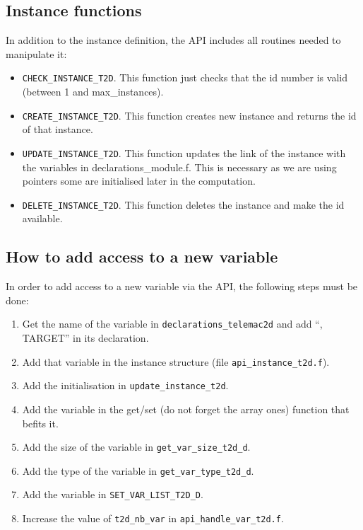 \subsection{Instance functions}

In addition to the instance definition, the API includes all routines needed to
manipulate it:

\begin{itemize}
\item \verb!CHECK_INSTANCE_T2D!. This function just checks that the id number
  is valid (between 1 and max\_instances).
\item \verb!CREATE_INSTANCE_T2D!. This function creates new instance and
  returns the id of that instance.
\item \verb!UPDATE_INSTANCE_T2D!. This function updates the link of the
  instance with the variables in declarations\_module.f. This is necessary as
  we are using pointers some are initialised later in the computation.
\item \verb!DELETE_INSTANCE_T2D!. This function deletes the instance and make
  the id available.
\end{itemize}
%
\subsection{How to add access to a new variable}
\label{var_add}
%
In order to add access to a new variable via the API, the following steps must
be done:

\begin{enumerate}
\item Get the name of the variable in \verb!declarations_telemac2d! and add ``,
  TARGET'' in its declaration.
\item Add that variable in the instance structure (file
  \verb!api_instance_t2d.f!).
\item Add the initialisation in \verb!update_instance_t2d!.
\item Add the variable in the get/set (do not forget the array ones) function
  that befits it.
\item Add the size of the variable in \verb!get_var_size_t2d_d!.
\item Add the type of the variable in \verb!get_var_type_t2d_d!.
\item Add the variable in \verb!SET_VAR_LIST_T2D_D!.
\item Increase the value of \verb!t2d_nb_var! in \verb!api_handle_var_t2d.f!.
\end{enumerate}


